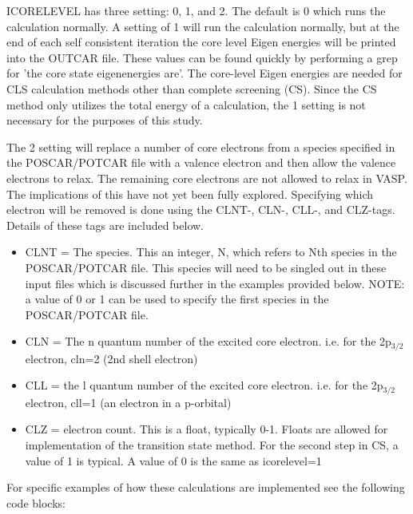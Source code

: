 \documentclass[number, sort&compress, review, 12pt]{elsarticle}
\begin{document}
ICORELEVEL has three setting: 0, 1, and 2. The default is 0 which runs the calculation normally. A setting of 1 will run the calculation normally, but at the end of each self consistent iteration the core level Eigen energies will be printed into the OUTCAR file. These values can be found quickly by performing a grep for 'the core state eigenenergies are'. The core-level Eigen energies are needed for CLS calculation methods other than complete screening (CS). Since the CS method only utilizes the total energy of a calculation, the 1 setting is not necessary for the purposes of this study.

The 2 setting will replace a number of core electrons from a species specified in the POSCAR/POTCAR file with a valence electron and then allow the valence electrons to relax. The remaining core electrons are not allowed to relax in VASP. The implications of this have not yet been fully explored. Specifying which electron will be removed is done using the CLNT-, CLN-, CLL-, and CLZ-tags. Details of these tags are included below.

\begin{itemize}
\item CLNT = The species. This an integer, N, which refers to Nth species in the POSCAR/POTCAR file. This species will need to be singled out in these input files which is discussed further in the examples provided below. NOTE: a value of 0 or 1 can be used to specify the first species in the POSCAR/POTCAR file.
\item CLN = The n quantum number of the excited core electron. i.e. for the 2p$_{\text{3/2}}$ electron, cln=2 (2nd shell electron)
\item CLL = the l quantum number of the excited core electron. i.e. for the 2p$_{\text{3/2}}$ electron, cll=1 (an electron in a p-orbital)
\item CLZ = electron count. This is a float, typically 0-1. Floats are allowed for implementation of the transition state method. For the second step in CS, a value of 1 is typical. A value of 0 is the same as icorelevel=1
\end{itemize}

For specific examples of how these calculations are implemented see the following code blocks:
\end{document}
